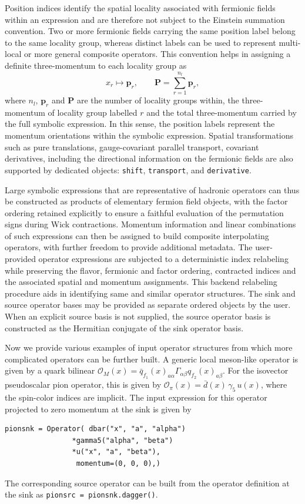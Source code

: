 \documentclass[a4paper,fleqn]{cas-dc}
\begin{document}
Position indices identify the spatial locality associated with fermionic fields within an expression and are therefore not subject to the Einstein summation convention. Two or more fermionic fields carrying the same position label belong to the same locality group, whereas distinct labels can be used to represent multi-local or more general composite operators. This convention helps in assigning a definite three-momentum to each locality group as 
\begin{equation}
 x_r \longmapsto \mathbf p_r,
 \qquad
 \mathbf P = \sum_{r=1}^{n_l} \mathbf p_r ,
\label{eq:operator_momentum_groups}
\end{equation}
where $n_l$, $\mathbf p_r$ and $\mathbf P$ are the number of locality groups within, the three-momentum of locality group labelled $r$ and the total three-momentum carried by the full symbolic expression. In this sense, the position labels represent the momentum orientations within the symbolic expression. Spatial transformations such as pure translations, gauge-covariant parallel transport, covariant derivatives, including the directional information on the fermionic fields are also supported by dedicated objects: \texttt{shift}, \texttt{transport}, and \texttt{derivative}. 

Large symbolic expressions that are representative of hadronic operators can thus be constructed as products of elementary fermion field objects, with the factor ordering retained explicitly to ensure a faithful evaluation of the permutation signs during Wick contractions. Momentum information and linear combinations of such expressions can then be assigned to build composite interpolating operators, with further freedom to provide additional metadata. The user-provided operator expressions are subjected to a deterministic index relabeling while preserving the flavor, fermionic and factor ordering, contracted indices and the associated spatial and momentum assignments. This backend relabeling procedure aids in identifying same and similar operator structures. The sink and source operator bases may be provided as separate ordered objects by the user. When an explicit source basis is not supplied, the source operator basis is constructed as the Hermitian conjugate of the sink operator basis. 

Now we provide various examples of input operator structures from which more complicated operators can be further built. A generic local meson-like operator is given by a quark bilinear $\mathcal O_M(x)=\bar q_{f_1}(x)_{a\alpha}\Gamma_{\alpha\beta} q_{f_2}(x)_{a\beta}$. For the isovector pseudoscalar pion operator, this is given by $\mathcal O_{\pi}(x) = \bar d(x)\,\gamma_5\,u(x)$, where the spin-color indices are implicit. The input expression for this operator projected to zero momentum at the sink is given by 
\begin{verbatim}
pionsnk = Operator( dbar("x", "a", "alpha")
                *gamma5("alpha", "beta")
                *u("x", "a", "beta"),
                 momentum=(0, 0, 0),)
\end{verbatim}
The corresponding source operator can be built from the operator definition at the sink as \texttt{pionsrc = pionsnk.dagger()}.
\end{document}
